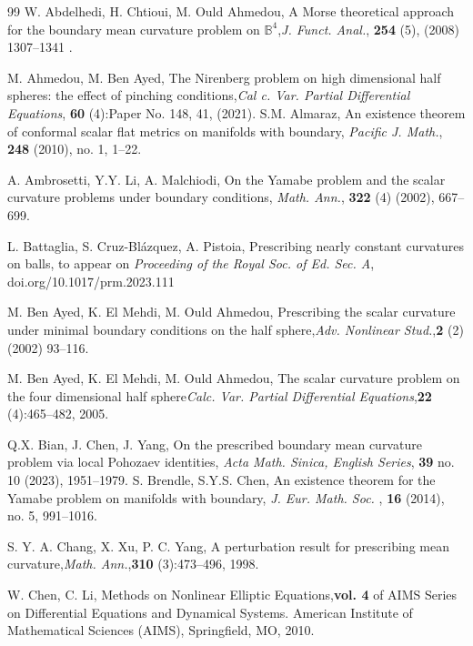 \documentclass[11pt,a4paper]{amsart}
\begin{document}
\begin{thebibliography}{99}
W. Abdelhedi, H. Chtioui, M. Ould Ahmedou, A Morse theoretical approach for the boundary mean curvature problem on $\mathbb B^4$,{\it J. Funct. Anal.}, {\bf 254} (5), (2008) 1307--1341 .

M. Ahmedou, M. Ben Ayed, The Nirenberg problem on high dimensional half spheres: the effect of pinching conditions,{\it Cal c. Var. Partial Differential Equations}, {\bf 60} (4):Paper No. 148, 41, (2021). 
S.M. Almaraz, An existence theorem of conformal scalar flat metrics on manifolds with boundary, {\it Pacific J. Math.}, {\bf 248} (2010), no. 1, 1--22.

A. Ambrosetti, Y.Y. Li, A. Malchiodi, On the Yamabe problem and the scalar curvature problems under boundary conditions, {\it Math. Ann.}, {\bf 322} (4) (2002), 667--699. 

L. Battaglia, S. Cruz-Bl\'azquez, A. Pistoia, Prescribing nearly constant curvatures on balls,  to appear on {\it Proceeding of the Royal Soc. of Ed. Sec. A}, doi.org/10.1017/prm.2023.111

M. Ben Ayed, K. El Mehdi, M. Ould Ahmedou, Prescribing the scalar curvature under minimal boundary conditions on the half sphere,{\it Adv. Nonlinear Stud.},{\bf  2} (2) (2002) 93--116.

M. Ben Ayed, K. El Mehdi, M. Ould Ahmedou, The scalar curvature problem on the four dimensional half sphere{\it Calc. Var. Partial Differential Equations},{\bf 22} (4):465--482, 2005.

Q.X. Bian, J. Chen, J. Yang, On the prescribed boundary mean curvature problem via local Pohozaev identities, {\it Acta Math. Sinica, English Series}, {\bf 39} no. 10 (2023), 1951--1979.
S. Brendle, S.Y.S. Chen, An existence theorem for the Yamabe problem on manifolds with boundary, {\it J. Eur. Math. Soc. }, {\bf 16} (2014), no. 5, 991--1016.

S. Y. A. Chang, X. Xu, P. C. Yang,  A perturbation result for prescribing mean curvature,{\it Math. Ann.},{\bf 310} (3):473--496, 1998.

W. Chen, C. Li, Methods on Nonlinear Elliptic Equations,{\bf vol. 4} of AIMS Series on Differential Equations and Dynamical Systems. American Institute of Mathematical Sciences (AIMS), Springfield, MO, 2010.


\end{thebibliography}
\end{document}
